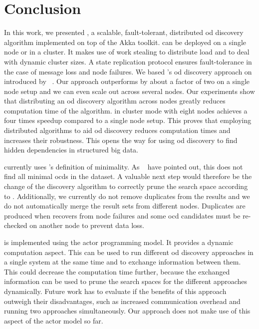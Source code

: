
\section{Conclusion}\label{sec:conclusion}

  In this work, we presented \dodo{}, a scalable, fault-tolerant, distributed \gls{od} discovery algorithm implemented on top of the Akka toolkit.
  \dodo{} can be deployed on a single node or in a cluster.
  It makes use of work stealing to distribute load and to deal with dynamic cluster sizes.
  A state replication protocol ensures fault-tolerance in the case of message loss and node failures.
  We based \dodo{}'s \gls{od} discovery approach on \ocddiscover{} introduced by \citeauthor{consonni}~\cite{consonni}.
  Our approach outperforms \ocddiscover{} by about a factor of two on a single node setup and we can even scale out across several nodes.
  Our experiments show that distributing an \gls{od} discovery algorithm across nodes greatly reduces computation time of the algorithm.
  \dodo{} in cluster mode with eight nodes achieves a four times speedup compared to a single node \dodo{} setup.
  This proves that employing distributed algorithms to aid \gls{od} discovery reduces computation times and increases their robustness.
  This opens the way for using \gls{od} discovery to find hidden dependencies in structured big data.

  \dodo{} currently uses \citeauthor{consonni}'s definition of minimality.
  As \citeauthor{szlichta:errata}~\cite{szlichta:errata} have pointed out, this does not find all minimal \glspl{ocd} in the dataset.
  A valuable next step would therefore be the change of the discovery algorithm to correctly prune the search space according to \cite{szlichta:errata}.
  Additionally, we currently do not remove duplicates from the results and we do not automatically merge the result sets from different nodes.
  Duplicates are produced when \dodo{} recovers from node failures and some \gls{ocd} candidates must be re-checked on another node to prevent data loss.

  \dodo{} is implemented using the actor programming model.
  It provides a dynamic computation aspect.
  This can be used to run different \gls{od} discovery approaches in a single system at the same time and to exchange information between them.
  This could decrease the computation time further, because the exchanged information can be used to prune the search spaces for the different approaches dynamically.
  Future work has to evaluate if the benefits of this approach outweigh their disadvantages, such as increased communication overhead and running two approaches simultaneously.
  Our approach does not make use of this aspect of the actor model so far.

